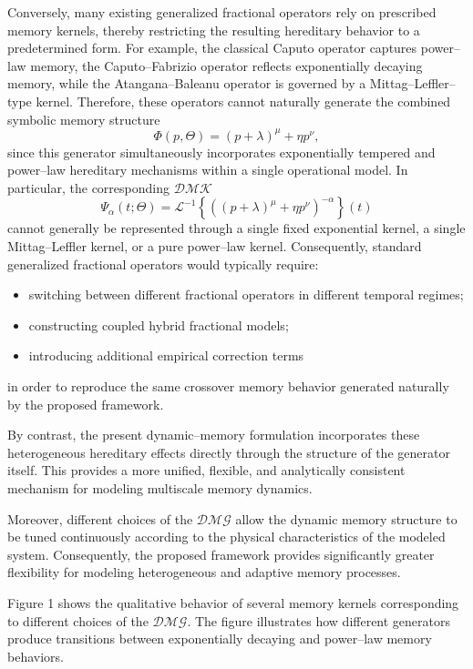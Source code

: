 \documentclass[11pt]{article}
\numberwithin{equation}{section}
\begin{document}
Conversely, many existing generalized fractional operators rely on prescribed memory kernels, thereby restricting the resulting hereditary behavior to a predetermined form. For example, the classical Caputo operator captures power--law memory, the Caputo--Fabrizio operator reflects exponentially decaying memory, while the Atangana--Baleanu operator is governed by a Mittag--Leffler--type kernel.
Therefore, these operators cannot naturally generate the combined symbolic memory structure
\[
\Phi(p,\Theta)
=
(p+\lambda)^{\mu}
+
\eta p^{\nu},
\]
since this generator simultaneously incorporates exponentially tempered and power--law hereditary mechanisms within a single operational model. In particular, the corresponding $\mathcal{DMK}$
\[
\Psi_{\alpha}(t;\Theta)
=
\mathcal L^{-1}
\left\{
\left(
(p+\lambda)^{\mu}
+
\eta p^{\nu}
\right)^{-\alpha}
\right\}(t)
\]
cannot generally be represented through a single fixed exponential kernel, a single Mittag--Leffler kernel, or a pure power--law kernel.
Consequently, standard generalized fractional operators would typically require:
\begin{itemize}[itemsep=2pt,topsep=2pt]

\item
switching between different fractional operators in different temporal regimes;

\item
constructing coupled hybrid fractional models;

\item
introducing additional empirical correction terms

\end{itemize}
in order to reproduce the same crossover memory behavior generated naturally by the proposed  framework.

By contrast, the present dynamic--memory formulation incorporates these heterogeneous hereditary effects directly through the structure of the generator itself. This provides a more unified, flexible, and analytically consistent mechanism for modeling multiscale memory dynamics.



Moreover, different choices of the $\mathcal{DMG}$
 allow the dynamic memory structure to be tuned continuously according to the physical characteristics of the modeled system. Consequently, the proposed framework provides significantly greater flexibility for modeling heterogeneous and adaptive memory processes.

Figure 1 shows the qualitative behavior of several memory kernels corresponding to different choices of the $\mathcal{DMG}$. 
The figure illustrates how different generators produce transitions between exponentially decaying and power--law memory behaviors.
\end{document}
